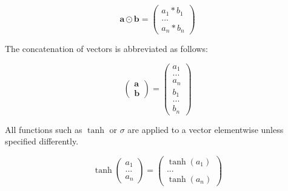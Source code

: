 \begin{equation*}
  \mathbf{a} \odot \mathbf{b} = \begin{pmatrix} a_1 * b_1 \\ ... \\ a_n * b_n \end{pmatrix}
\end{equation*}

The concatenation of vectors is abbreviated as follows:

\begin{equation*}
  \begin{pmatrix} \mathbf{a} \\ \mathbf{b} \end{pmatrix} = \begin{pmatrix} a_1 \\ ... \\ a_n \\ b_1 \\ ... \\ b_n \end{pmatrix}
\end{equation*}

All functions such as \(\tanh\) or \(\sigma\) are applied to a vector elementwise unless specified differently.

\begin{equation*}
  \tanh \begin{pmatrix} a_1 \\ ... \\ a_n \end{pmatrix} = \begin{pmatrix} \tanh(a_1) \\ ... \\ \tanh(a_n) \end{pmatrix}
\end{equation*}
